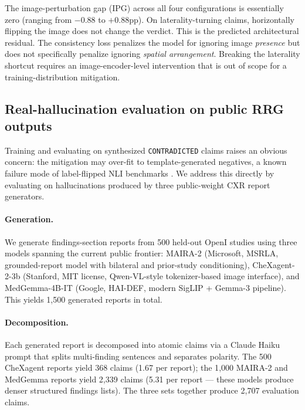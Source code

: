 \documentclass[pmlr]{jmlr}
\begin{document}
The image-perturbation gap (IPG) across all four configurations is essentially zero (ranging from $-0.88$ to $+0.88$pp). On laterality-turning claims, horizontally flipping the image does not change the verdict. This is the predicted architectural residual. The consistency loss penalizes the model for ignoring image \emph{presence} but does not specifically penalize ignoring \emph{spatial arrangement}. Breaking the laterality shortcut requires an image-encoder-level intervention that is out of scope for a training-distribution mitigation.

\subsection{Real-hallucination evaluation on public RRG outputs}
\label{sec:real-rrg}

Training and evaluating on synthesized \texttt{CONTRADICTED} claims raises an obvious concern: the mitigation may over-fit to template-generated negatives, a known failure mode of label-flipped NLI benchmarks \citep{gururangan2018annotation}. We address this directly by evaluating on hallucinations produced by three public-weight CXR report generators.

\paragraph{Generation.} We generate findings-section reports from 500 held-out OpenI studies using three models spanning the current public frontier: MAIRA-2 \citep{bannur2024maira2} (Microsoft, MSRLA, grounded-report model with bilateral and prior-study conditioning), CheXagent-2-3b \citep{chen2024chexagent} (Stanford, MIT license, Qwen-VL-style tokenizer-based image interface), and MedGemma-4B-IT \citep{google2025medgemma} (Google, HAI-DEF, modern SigLIP + Gemma-3 pipeline). This yields 1{,}500 generated reports in total.

\paragraph{Decomposition.} Each generated report is decomposed into atomic claims via a Claude Haiku prompt that splits multi-finding sentences and separates polarity. The 500 CheXagent reports yield 368 claims (1.67 per report); the 1{,}000 MAIRA-2 and MedGemma reports yield 2{,}339 claims (5.31 per report — these models produce denser structured findings lists). The three sets together produce 2{,}707 evaluation claims.
\end{document}

